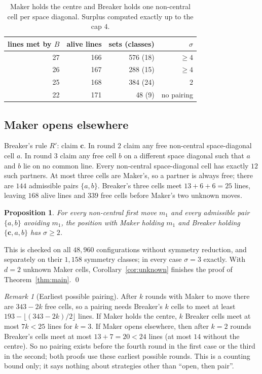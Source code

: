 \documentclass[11pt]{amsart}
\newtheorem{proposition}[theorem]{Proposition}
\theoremstyle{definition}
\theoremstyle{remark}
\newtheorem{remark}[theorem]{Remark}
\newcommand{\cc}{\mathbf c}
\begin{document}
\begin{table}[h]
\centering
\begin{tabular}{rrrr}
\toprule
lines met by $B$ & alive lines & sets (classes) & $\sigma$\\
\midrule
27 & 166 & 576 (18) & $\ge 4$\\
26 & 167 & 288 (15) & $\ge 4$\\
25 & 168 & 384 (24) & $2$\\
22 & 171 & 48 (9) & no pairing\\
\bottomrule
\end{tabular}
\caption{Maker holds the centre and Breaker holds one non-central cell per space diagonal. Surplus computed exactly up to the cap $4$.}\label{tab:centre}
\end{table}

\subsection*{Maker opens elsewhere}
Breaker's rule $R'$: claim $\cc$. In round $2$ claim any free non-central space-diagonal cell $a$. In round $3$ claim any free cell $b$ on a different space diagonal such that $a$ and $b$ lie on no common line. Every non-central space-diagonal cell has exactly $12$ such partners. At most three cells are Maker's, so a partner is always free; there are $144$ admissible pairs $\{a,b\}$. Breaker's three cells meet $13+6+6=25$ lines, leaving $168$ alive lines and $339$ free cells before Maker's two unknown moves.

\begin{proposition}\label{prop:noncentre}
For every non-central first move $m_1$ and every admissible pair $\{a,b\}$ avoiding $m_1$, the position with Maker holding $m_1$ and Breaker holding $\{\cc,a,b\}$ has $\sigma\ge 2$.
\end{proposition}

This is checked on all $48{,}960$ configurations without symmetry reduction, and separately on their $1{,}158$ symmetry classes; in every case $\sigma=3$ exactly. With $d=2$ unknown Maker cells, Corollary~\ref{cor:unknown} finishes the proof of Theorem~\ref{thm:main}. \qed

\begin{remark}[Earliest possible pairing]\label{rem:optimal}
After $k$ rounds with Maker to move there are $343-2k$ free cells, so a pairing needs Breaker's $k$ cells to meet at least $193-\lfloor(343-2k)/2\rfloor$ lines. If Maker holds the centre, $k$ Breaker cells meet at most $7k<25$ lines for $k=3$. If Maker opens elsewhere, then after $k=2$ rounds Breaker's cells meet at most $13+7=20<24$ lines (at most $14$ without the centre). So no pairing exists before the fourth round in the first case or the third in the second; both proofs use these earliest possible rounds. This is a counting bound only; it says nothing about strategies other than ``open, then pair''.
\end{remark}
\end{document}
